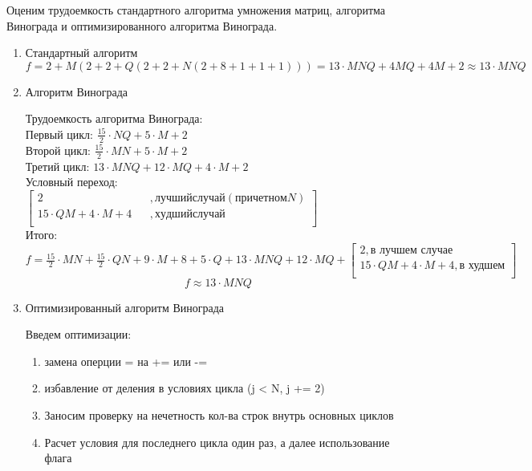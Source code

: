 \documentclass[a4paper,12pt]{article}
\begin{document}
	Оценим трудоемкость стандартного алгоритма умножения матриц, алгоритма Винограда и оптимизированного алгоритма Винограда.
	 \begin{enumerate}
		\item Стандартный алгоритм
		$$f=2+M(2+2+Q(2+2+N(2+8+1+1+1)))=13 \cdot MNQ+4MQ+4M+2 \approx 13 \cdot MNQ$$ 
		
		\item Алгоритм Винограда
		
		Трудоемкость алгоритма Винограда:\\
		
		Первый цикл: $\frac{15}{2} \cdot N  Q + 5 \cdot M + 2$ \\
		
		Второй цикл: $\frac{15}{2} \cdot M  N + 5 \cdot M + 2$\\
		
		Третий цикл: $13 \cdot M  N Q + 12 \cdot M Q + 4 \cdot M + 2$\\
		
		Условный переход: $\begin{bmatrix}
			2    &&, {лучший случай (при четном N)}\\
			15 \cdot QM + 4 \cdot M + 4 &&, {худший случай}\\
		\end{bmatrix} $ \\
		
		Итого: $f = \frac{15}{2} \cdot M  N + \frac{15}{2} \cdot Q  N + 9 \cdot M + 8 +  5 \cdot Q + 13 \cdot M  N Q + 12 \cdot M Q 
		+
		\begin{bmatrix}
			2, \text{в лучшем случае}\\
			15 \cdot QM + 4 \cdot M + 4,\text{в худшем}\\
		\end{bmatrix} $ \\
		
		$$f \approx 13 \cdot MNQ $$
		
		\item Оптимизированный алгоритм Винограда
		
		Введем оптимизации: 
		\begin{enumerate}
			\item замена оперции = на += или -=
			\item избавление от деления в условиях цикла (j < N, j += 2)
			\item Заносим проверку на нечетность кол-ва строк внутрь основных циклов
			\item Расчет условия для последнего цикла один раз, а далее использование флага
		\end{enumerate}
		

\end{enumerate}
\end{document}
